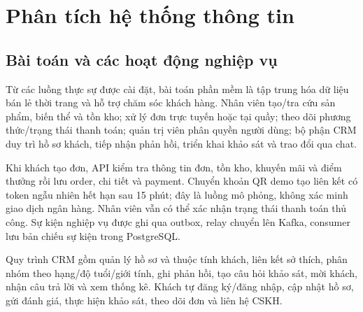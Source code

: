 \chapter{Phân tích hệ thống thông tin}
\section{Bài toán và các hoạt động nghiệp vụ}
Từ các luồng thực sự được cài đặt, bài toán phần mềm là tập trung hóa dữ liệu bán lẻ thời trang và hỗ trợ chăm sóc khách hàng. Nhân viên tạo/tra cứu sản phẩm, biến thể và tồn kho; xử lý đơn trực tuyến hoặc tại quầy; theo dõi phương thức/trạng thái thanh toán; quản trị viên phân quyền người dùng; bộ phận CRM duy trì hồ sơ khách, tiếp nhận phản hồi, triển khai khảo sát và trao đổi qua chat.

Khi khách tạo đơn, API kiểm tra thông tin đơn, tồn kho, khuyến mãi và điểm thưởng rồi lưu order, chi tiết và payment. Chuyển khoản QR demo tạo liên kết có token ngẫu nhiên hết hạn sau 15 phút; đây là luồng mô phỏng, không xác minh giao dịch ngân hàng. Nhân viên vẫn có thể xác nhận trạng thái thanh toán thủ công. Sự kiện nghiệp vụ được ghi qua outbox, relay chuyển lên Kafka, consumer lưu bản chiếu sự kiện trong PostgreSQL.

Quy trình CRM gồm quản lý hồ sơ và thuộc tính khách, liên kết sở thích, phân nhóm theo hạng/độ tuổi/giới tính, ghi phản hồi, tạo câu hỏi khảo sát, mời khách, nhận câu trả lời và xem thống kê. Khách tự đăng ký/đăng nhập, cập nhật hồ sơ, gửi đánh giá, thực hiện khảo sát, theo dõi đơn và liên hệ CSKH.

